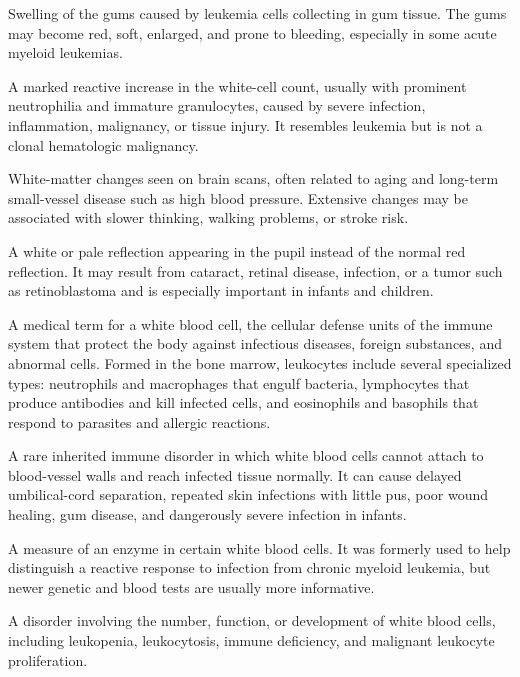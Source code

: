  Swelling of the gums caused by leukemia cells collecting in gum tissue. The gums may become red, soft, enlarged, and prone to bleeding, especially in some acute myeloid leukemias.

 A marked reactive increase in the white-cell count, usually with prominent neutrophilia
and immature granulocytes, caused by severe infection, inflammation, malignancy, or
tissue injury. It resembles leukemia but is not a clonal hematologic malignancy.

 White-matter changes seen on brain scans, often related to aging and long-term small-vessel disease such as high blood pressure. Extensive changes may be associated with slower thinking, walking problems, or stroke risk.

 A white or pale reflection appearing in the pupil instead of the normal red reflection. It may result from cataract, retinal disease, infection, or a tumor such as retinoblastoma and is especially important in infants and children.

 A medical term for a white blood cell, the cellular defense units of the immune system that protect the body against infectious diseases, foreign substances, and abnormal cells. Formed in the bone marrow, leukocytes include several specialized types: neutrophils and macrophages that engulf bacteria, lymphocytes that produce antibodies and kill infected cells, and eosinophils and basophils that respond to parasites and allergic reactions.

 A rare inherited immune disorder in which white blood cells cannot attach to blood-vessel walls and reach infected tissue normally. It can cause delayed umbilical-cord separation, repeated skin infections with little pus, poor wound healing, gum disease, and dangerously severe infection in infants.

 A measure of an enzyme in certain white blood cells. It was formerly used to help distinguish a reactive response to infection from chronic myeloid leukemia, but newer genetic and blood tests are usually more informative.

 A disorder involving the number, function, or development of white blood cells, including leukopenia, leukocytosis, immune deficiency, and malignant leukocyte proliferation.

